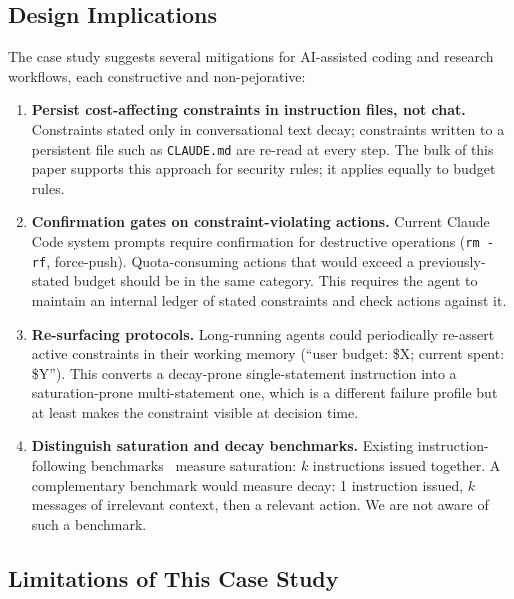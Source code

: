 \documentclass[11pt,a4paper]{article}
\begin{document}
\subsection{Design Implications}

The case study suggests several mitigations for AI-assisted coding and research workflows, each constructive and non-pejorative:

\begin{enumerate}
    \item \textbf{Persist cost-affecting constraints in instruction files, not chat.} Constraints stated only in conversational text decay; constraints written to a persistent file such as \texttt{CLAUDE.md} are re-read at every step. The bulk of this paper supports this approach for security rules; it applies equally to budget rules.
    \item \textbf{Confirmation gates on constraint-violating actions.} Current Claude Code system prompts require confirmation for destructive operations (\texttt{rm -rf}, force-push). Quota-consuming actions that would exceed a previously-stated budget should be in the same category. This requires the agent to maintain an internal ledger of stated constraints and check actions against it.
    \item \textbf{Re-surfacing protocols.} Long-running agents could periodically re-assert active constraints in their working memory (``user budget: \$X; current spent: \$Y''). This converts a decay-prone single-statement instruction into a saturation-prone multi-statement one, which is a different failure profile but at least makes the constraint visible at decision time.
    \item \textbf{Distinguish saturation and decay benchmarks.} Existing instruction-following benchmarks~\citep{he2025curse} measure saturation: $k$ instructions issued together. A complementary benchmark would measure decay: 1 instruction issued, $k$ messages of irrelevant context, then a relevant action. We are not aware of such a benchmark.
\end{enumerate}

\subsection{Limitations of This Case Study}
\end{document}
